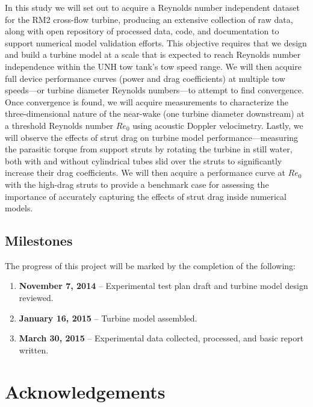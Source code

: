 \documentclass[12pt,letterpaper]{scrreprt}
\begin{document}
In this study we will set out to acquire a Reynolds number independent dataset
for the RM2 cross-flow turbine, producing an extensive collection of raw data,
along with open repository of processed data, code, and documentation to support
numerical model validation efforts. This objective requires that we design and
build a turbine model at a scale that is expected to reach Reynolds number
independence within the UNH tow tank's tow speed range. We will then acquire
full device performance curves (power and drag coefficients) at multiple tow
speeds---or turbine diameter Reynolds numbers---to attempt to find convergence.
Once convergence is found, we will acquire measurements to characterize the
three-dimensional nature of the near-wake (one turbine diameter downstream) at a
threshold Reynolds number $Re_0$ using acoustic Doppler velocimetry. Lastly, we
will observe the effects of strut drag on turbine model performance---measuring
the parasitic torque from support struts by rotating the turbine in still water,
both with and without cylindrical tubes slid over the struts to significantly
increase their drag coefficients. We will then acquire a performance curve at
$Re_0$ with the high-drag struts to provide a benchmark case for assessing the
importance of accurately capturing the effects of strut drag inside numerical
models.


\section{Milestones}
The progress of this project will be marked by the completion of the following:

\begin{enumerate}

	\item \textbf{November 7, 2014} -- Experimental test plan draft and turbine
	model design reviewed.
	
	\item \textbf{January 16, 2015} -- Turbine model assembled.
	
	\item \textbf{March 30, 2015} -- Experimental data collected, processed, and
	basic report written.

\end{enumerate}


\chapter{Acknowledgements}
\end{document}
